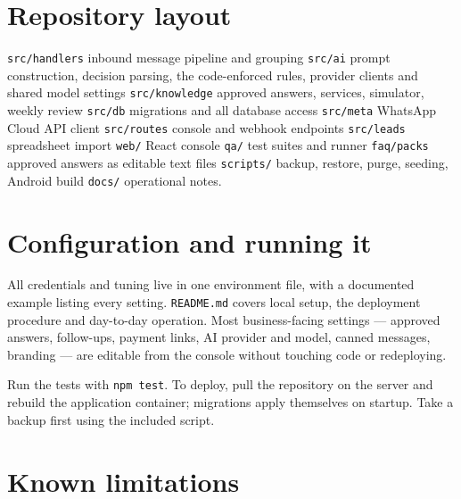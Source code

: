\documentclass[10pt,a4paper]{article}
\begin{document}
\section{Repository layout}

\texttt{src/handlers} inbound message pipeline and grouping \textbullet{}
\texttt{src/ai} prompt construction, decision parsing, the code-enforced rules,
provider clients and shared model settings \textbullet{} \texttt{src/knowledge}
approved answers, services, simulator, weekly review \textbullet{}
\texttt{src/db} migrations and all database access \textbullet{}
\texttt{src/meta} WhatsApp Cloud API client \textbullet{} \texttt{src/routes}
console and webhook endpoints \textbullet{} \texttt{src/leads} spreadsheet
import \textbullet{} \texttt{web/} React console \textbullet{} \texttt{qa/}
test suites and runner \textbullet{} \texttt{faq/packs} approved answers as
editable text files \textbullet{} \texttt{scripts/} backup, restore, purge,
seeding, Android build \textbullet{} \texttt{docs/} operational notes.

\section{Configuration and running it}

All credentials and tuning live in one environment file, with a documented
example listing every setting. \texttt{README.md} covers local setup, the
deployment procedure and day-to-day operation. Most business-facing settings
--- approved answers, follow-ups, payment links, AI provider and model, canned
messages, branding --- are editable from the console without touching code or
redeploying.

Run the tests with \texttt{npm test}. To deploy, pull the repository on the
server and rebuild the application container; migrations apply themselves on
startup. Take a backup first using the included script.

\section{Known limitations}
\end{document}
